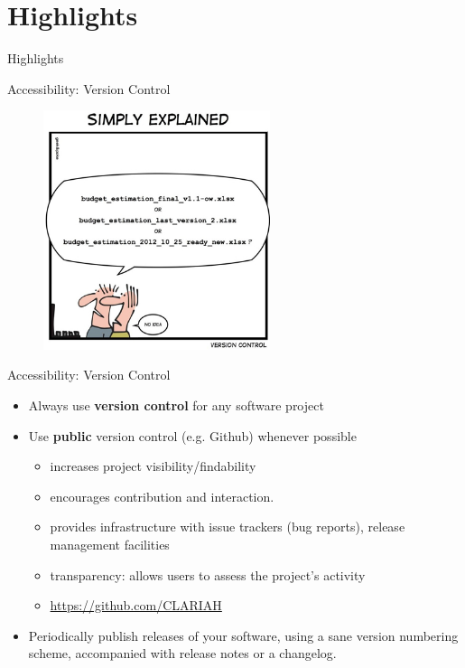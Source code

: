 \documentclass[compress]{beamer}
\begin{document}
\section{Highlights}

\begin{frame}{Highlights}
\end{frame}

\begin{frame}{Accessibility: Version Control}
\begin{figure}
\includegraphics[height=7cm]{img/versioncontrol.jpg}
\end{figure}
\end{frame}

\begin{frame}{Accessibility: Version Control}
\begin{itemize}
    \item Always use \textbf{version control} for any software project
    \item Use \textbf{public} version control (e.g. Github) whenever possible
    \begin{itemize}
        \item increases project visibility/findability
        \item encourages contribution and interaction.
        \item provides infrastructure with issue trackers (bug reports), release management facilities
        \item transparency: allows users to assess the project's activity
        \item \url{https://github.com/CLARIAH}
    \end{itemize}
    \item Periodically publish releases of your software, using a sane version
        numbering scheme, accompanied with release notes or a changelog.
\end{itemize}
\end{frame}
\end{document}
